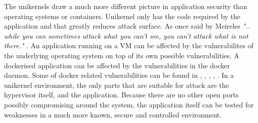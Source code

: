 The unikernels draw a much more different picture in application security than operating systems or containers. Unikernel only has the code required by the application and that greatly reduces attack surface. As once said by Meireles  \textit{".. while you can sometimes attack what you can't see, you can't attack what is not there."} \cite{mailing-list}. An application running on a VM can be affected by the vulnerabilites of the underlying operating system on top of its own possible vulnerabilities. A dockerised application can be affected by the vulnerabilities in the docker daemon. Some of docker related vulnerabilities can be found in \cite{CVE-2019-14271-details}, \cite{CVE-2018-9862-details}, \cite{CVE-2018-8115-details}, \cite{CVE-2018-11757-details}, \cite{CVE-2019-5736-details}. In a unikernel environment, the only parts that are suitable for attack are the hypervisor itself, and the application. Because there are no other open ports possibly compromising around the system, the application itself can be tested for weaknesses in a much more known, secure and controlled environment.

